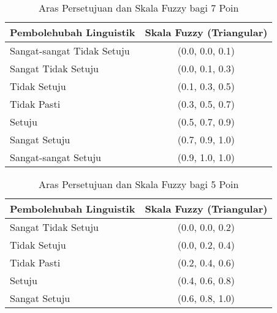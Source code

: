 \begin{itemize}
\begin{table}[H]
\centering
\caption{Aras Persetujuan dan Skala Fuzzy bagi 7 Poin}
\label{jadual:skalaFuzzy}
\begin{tabular}{|p{6cm}|c|}
\hline
\textbf{Pembolehubah Linguistik} & \textbf{Skala Fuzzy (Triangular)} \\
\hline
Sangat-sangat Tidak Setuju & (0.0, 0.0, 0.1) \\
Sangat Tidak Setuju & (0.0, 0.1, 0.3) \\
Tidak Setuju & (0.1, 0.3, 0.5) \\
Tidak Pasti & (0.3, 0.5, 0.7) \\
Setuju & (0.5, 0.7, 0.9) \\
Sangat Setuju & (0.7, 0.9, 1.0) \\
Sangat-sangat Setuju & (0.9, 1.0, 1.0) \\
\hline
\end{tabular}
\end{table}
\begin{table}[h]
\centering
\caption{Aras Persetujuan dan Skala Fuzzy bagi 5 Poin}
\label{jadual:fuzzy5poin}
\begin{tabular}{|p{6cm}|c|}
\hline
\textbf{Pembolehubah Linguistik} & \textbf{Skala Fuzzy (Triangular)} \\
\hline
Sangat Tidak Setuju & (0.0, 0.0, 0.2) \\
Tidak Setuju & (0.0, 0.2, 0.4) \\
Tidak Pasti & (0.2, 0.4, 0.6) \\
Setuju & (0.4, 0.6, 0.8) \\
Sangat Setuju & (0.6, 0.8, 1.0) \\
\hline
\end{tabular}
\end{table}


\end{itemize}
